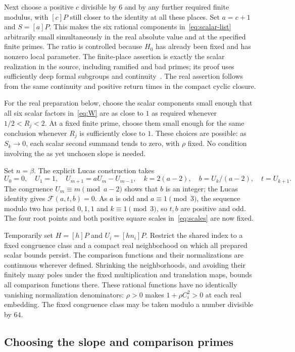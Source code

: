\documentclass[11pt,a4paper]{article}
\begin{document}
Next choose a positive $c$ divisible by $6$ and by any further
required finite modulus, with $[c]P$ still closer to the identity
at all these places. Set $a=c+1$ and $S=[a]P$. This makes the
six rational components in~\eqref{eq:scalar-list} arbitrarily small
simultaneously in the real absolute value and at the specified finite
primes. The ratio is controlled because $H_0$ has already been
fixed and has nonzero local parameter. The finite-place assertion
is exactly the scalar realization in the source, including ramified
and bad primes; its proof uses sufficiently deep formal subgroups
and continuity~\cite{Glazer}. The real assertion follows from
the same continuity and positive return times in the compact cyclic
closure.

For the real preparation below, choose the scalar components small
enough that all six scalar factors in~\eqref{eq:W} are as close
to $1$ as required whenever $1/2<R_j<2$. At a fixed finite prime,
choose them small enough for the same conclusion whenever $R_j$
is sufficiently close to $1$. These choices are possible: as
$S_k\to0$, each scalar second summand tends to zero, with
$\rho$ fixed. No condition involving the as yet unchosen slope
is needed.

Set $n=\beta$. The explicit Lucas construction takes
\[
 U_0=0,\quad U_1=1,\quad U_{m+1}=aU_m-U_{m-1},\quad
 k=2(a-2),\quad b=U_k/(a-2),\quad t=U_{k+1}.
\]
The congruence $U_m\equiv m\pmod{a-2}$ shows that $b$ is an
integer; the Lucas identity gives $\mathcal F(a,t,b)=0$.
As $a$ is odd and $a\equiv1\pmod3$, the sequence modulo two
has period $0,1,1$ and $k\equiv1\pmod3$, so $t,b$ are positive
and odd. The four root points and both positive square scales
in~\eqref{eq:scales} are now fixed.

Temporarily set $H=[h]P$ and $U_i=[hn_i]P$. Restrict the shared
index to a fixed congruence class and a compact real neighborhood
on which all prepared scalar bounds persist. The comparison functions
and their normalizations are continuous wherever defined. Shrinking
the neighborhoods, and avoiding their finitely many poles under
the fixed multiplication and translation maps, bounds all comparison
functions there. These rational functions have no identically vanishing
normalization denominators: $\rho>0$ makes $1+\rho C_i^2>0$
at each real embedding. The fixed congruence class may be taken
modulo a number divisible by $64$.

\subsection{Choosing the slope and comparison primes}
\end{document}
